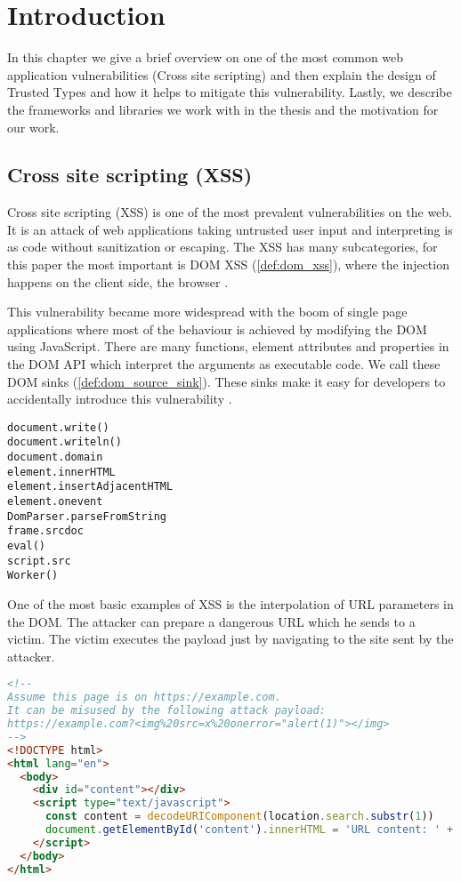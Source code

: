 \chapter{Introduction}

In this chapter we give a brief overview on one of the most common web application vulnerabilities
(Cross site scripting) and then explain the design of Trusted Types and how it helps to mitigate
this vulnerability. Lastly, we describe the frameworks and libraries we work with in the thesis and
the motivation for our work.

\section{Cross site scripting (XSS)}

Cross site scripting (XSS) is one of the most prevalent vulnerabilities on the web. It is an attack
of web applications taking untrusted user input and interpreting is as code without sanitization or
escaping. The XSS has many subcategories, for this paper the most important is DOM XSS
(\ref{def:dom_xss}), where the injection happens on the client side, the browser
\cite{tt_web_framework_paper}.

This vulnerability became more widespread with the boom of single page applications where most of
the behaviour is achieved by modifying the DOM using JavaScript. There are many functions, element
attributes and properties in the DOM API which interpret the arguments as executable code. We call
these DOM sinks (\ref{def:dom_source_sink}). These sinks make it easy for developers to accidentally
introduce this vulnerability \cite{tt_web_framework_paper}.

\bigskip
\begin{lstlisting}[language={}, caption=Examples of DOM XSS attack vectors \cite{dom_xss_portswigger} \cite{tt_web_framework_paper}]
document.write()
document.writeln()
document.domain
element.innerHTML
element.insertAdjacentHTML
element.onevent
DomParser.parseFromString
frame.srcdoc
eval()
script.src
Worker()
\end{lstlisting}

One of the most basic examples of XSS is the interpolation of URL parameters in the DOM. The
attacker can prepare a dangerous URL which he sends to a victim. The victim executes the payload
just by navigating to the site sent by the attacker.

\bigskip
\begin{lstlisting}[language=HTML, caption=Basic example of XSS via unsafe URL parameter interpolation]
<!--
Assume this page is on https://example.com.
It can be misused by the following attack payload:
https://example.com?<img%20src=x%20onerror="alert(1)"></img>
-->
<!DOCTYPE html>
<html lang="en">
  <body>
    <div id="content"></div>
    <script type="text/javascript">
      const content = decodeURIComponent(location.search.substr(1))
      document.getElementById('content').innerHTML = 'URL content: ' + content
    </script>
  </body>
</html>
\end{lstlisting}

